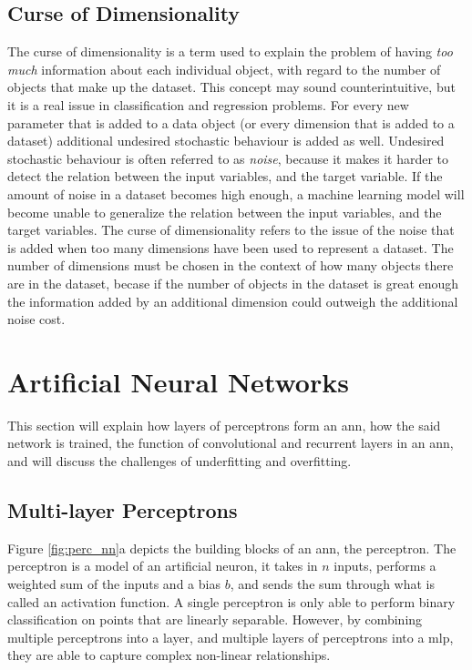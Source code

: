 \subsection{Curse of Dimensionality} \label{sec:curse_dimensionality}
The curse of dimensionality is a term used to explain the problem of having \textit{too much} information about each individual object, with regard to the number of objects that make up the dataset. This concept may sound counterintuitive, but it is a real issue in classification and regression problems. For every new parameter that is added to a data object (or every dimension that is added to a dataset) additional undesired stochastic behaviour is added as well. Undesired stochastic behaviour is often referred to as \textit{noise}, because it makes it harder to detect the relation between the input variables, and the target variable. If the amount of noise in a dataset becomes high enough, a machine learning model will become unable to generalize the relation between the input variables, and the target variables. The curse of dimensionality refers to the issue of the noise that is added when too many dimensions have been used to represent a dataset. The number of dimensions must be chosen in the context of how many objects there are in the dataset, becase if the number of objects in the dataset is great enough the information added by an additional dimension could outweigh the additional noise cost.

\clearpage

\section{Artificial Neural Networks} \label{sec:ann}

This section will explain how layers of perceptrons form an \acrfull{ann}, how the said network is trained, the function of convolutional and recurrent layers in an \acrshort{ann}, and will discuss the challenges of underfitting and overfitting.

\subsection{Multi-layer Perceptrons} \label{sec:mlp}
Figure \ref{fig:perc_nn}a depicts the building blocks of an \acrshort{ann}, the perceptron. 
The perceptron is a model of an artificial neuron, it takes in $n$ inputs, performs a weighted sum of the inputs and a bias $b$, and sends the sum through what is called an activation function. A single perceptron is only able to perform binary classification on points that are linearly separable. However, by combining multiple perceptrons into a layer, and multiple layers of perceptrons into a \acrfull{mlp}, they are able to capture complex non-linear relationships. 

